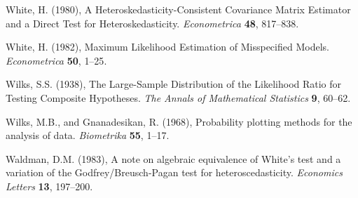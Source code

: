 \phantom{a}

\rff White, H. (1980),
      A Heteroskedasticity-Consistent Covariance Matrix Estimator and a Direct Test for Heteroskedasticity.
      {\it Econometrica}
      {\bf 48}, {817--838}.

\phantom{a}

\rff White, H. (1982),
      Maximum Likelihood Estimation of Misspecified Models.
      {\it Econometrica}
      {\bf 50}, {1--25}.

\phantom{a}

\rff Wilks, S.S. (1938),
      The Large-Sample Distribution of the Likelihood Ratio for Testing Composite Hypotheses.
      {\it The Annals of Mathematical Statistics}
      {\bf 9}, {60--62}.

\phantom{a}

\rff Wilks, M.B., and Gnanadesikan, R. (1968),
      Probability plotting methods for the analysis of data.
      {\it Biometrika}
      {\bf 55}, {1--17}.

\phantom{a}

\rff Waldman, D.M. (1983),
      A note on algebraic equivalence of White's test and a variation of the Godfrey/Breusch-Pagan test for heteroscedasticity.
      {\it Economics Letters}
      {\bf 13}, {197--200}.


